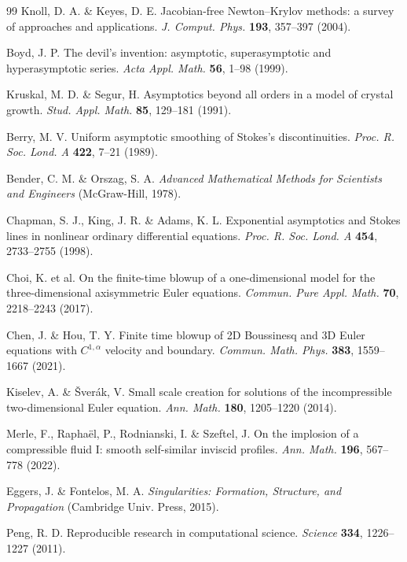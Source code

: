 \documentclass[11pt]{article}
\begin{document}
\begin{thebibliography}{99}
 Knoll, D. A. \& Keyes, D. E. Jacobian-free Newton--Krylov methods: a survey of approaches and
applications. \textit{J. Comput. Phys.} \textbf{193}, 357--397 (2004).

 Boyd, J. P. The devil's invention: asymptotic, superasymptotic and hyperasymptotic series.
\textit{Acta Appl. Math.} \textbf{56}, 1--98 (1999).

 Kruskal, M. D. \& Segur, H. Asymptotics beyond all orders in a model of crystal growth.
\textit{Stud. Appl. Math.} \textbf{85}, 129--181 (1991).

 Berry, M. V. Uniform asymptotic smoothing of Stokes's discontinuities. \textit{Proc. R. Soc.
Lond. A} \textbf{422}, 7--21 (1989).

 Bender, C. M. \& Orszag, S. A. \textit{Advanced Mathematical Methods for Scientists and
Engineers} (McGraw-Hill, 1978).

 Chapman, S. J., King, J. R. \& Adams, K. L. Exponential asymptotics and Stokes lines in
nonlinear ordinary differential equations. \textit{Proc. R. Soc. Lond. A} \textbf{454}, 2733--2755 (1998).

 Choi, K. et al. On the finite-time blowup of a one-dimensional model for the three-dimensional
axisymmetric Euler equations. \textit{Commun. Pure Appl. Math.} \textbf{70}, 2218--2243 (2017).

 Chen, J. \& Hou, T. Y. Finite time blowup of 2D Boussinesq and 3D Euler equations with
$C^{1,\alpha}$ velocity and boundary. \textit{Commun. Math. Phys.} \textbf{383}, 1559--1667 (2021).

 Kiselev, A. \& \v{S}ver\'ak, V. Small scale creation for solutions of the incompressible
two-dimensional Euler equation. \textit{Ann. Math.} \textbf{180}, 1205--1220 (2014).

 Merle, F., Rapha\"el, P., Rodnianski, I. \& Szeftel, J. On the implosion of a compressible fluid
I: smooth self-similar inviscid profiles. \textit{Ann. Math.} \textbf{196}, 567--778 (2022).

 Eggers, J. \& Fontelos, M. A. \textit{Singularities: Formation, Structure, and Propagation}
(Cambridge Univ. Press, 2015).

 Peng, R. D. Reproducible research in computational science. \textit{Science} \textbf{334},
1226--1227 (2011).


\end{thebibliography}
\end{document}
